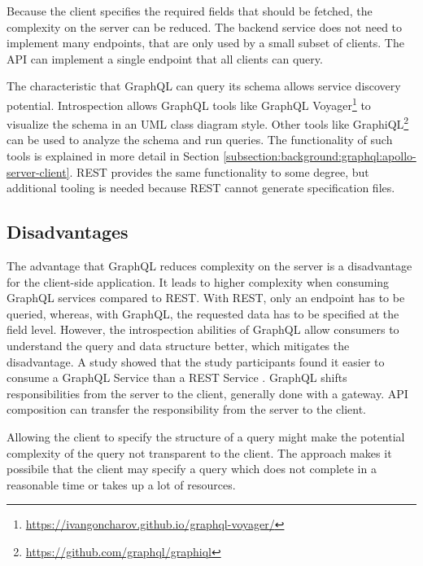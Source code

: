 \bigskip

\noindent Because the client specifies the required fields that should be fetched, the complexity on the server can be reduced. The backend service does not need to implement many endpoints, that are only used by a small subset of clients. The \ac{API} can implement a single endpoint that all clients can query. \cite{book:2018:richardson:background:bff:microservices-patterns}

\bigskip

\noindent The characteristic that GraphQL can query its schema allows service discovery potential. Introspection allows GraphQL tools like GraphQL Voyager\footnote{\url{https://ivangoncharov.github.io/graphql-voyager/}} to visualize the schema in an \ac{UML} class diagram style. Other tools like GraphiQL\footnote{\url{https://github.com/graphql/graphiql}} can be used to analyze the schema and run queries. The functionality of such tools is explained in more detail in Section \ref{subsection:background:graphql:apollo-server-client}. \ac{REST} provides the same functionality to some degree, but additional tooling is needed because \ac{REST} cannot generate specification files.

\subsection{Disadvantages}\label{subsection:background:graphql:graphql-disadvantages}

\noindent The advantage that GraphQL reduces complexity on the server is a disadvantage for the client-side application. It leads to higher complexity when consuming GraphQL services compared to \ac{REST}. With \ac{REST}, only an endpoint has to be queried, whereas, with GraphQL, the requested data has to be specified at the field level. However, the introspection abilities of GraphQL allow consumers to understand the query and data structure better, which mitigates the disadvantage. A study \cite{inproceedings:2020:brito:background:graphql:rest-vs-graphql} showed that the study participants found it easier to consume a GraphQL Service than a \ac{REST} Service \cite{inproceedings:2017:de-pauda:background:graphql:handling-anti-patterns}. GraphQL shifts responsibilities from the server to the client, generally done with a gateway. \ac{API} composition can transfer the responsibility from the server to the client.

\bigskip

\noindent Allowing the client to specify the structure of a query might make the potential complexity of the query not transparent to the client. The approach makes it possibile that the client may specify a query which does not complete in a reasonable time or takes up a lot of resources. \cite{book:2018:richardson:background:bff:microservices-patterns}




